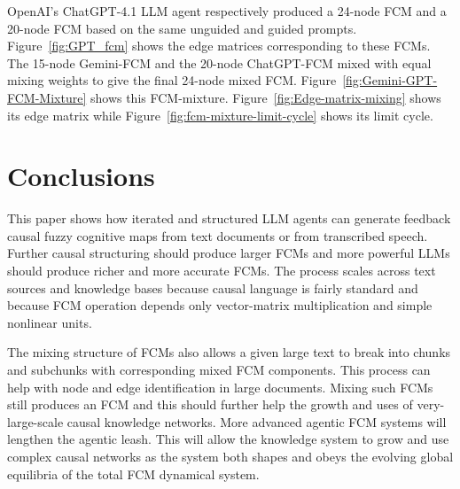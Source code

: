 \documentclass[runningheads]{llncs}
\begin{document}
OpenAI's ChatGPT-4.1 LLM agent respectively produced a 24-node FCM and a 20-node FCM based on the same unguided and guided prompts. 
Figure~\ref{fig:GPT_fcm} shows the edge matrices corresponding to these FCMs.
The 15-node Gemini-FCM and the 20-node ChatGPT-FCM mixed with equal mixing weights to give the final 24-node mixed FCM. 
Figure~\ref{fig:Gemini-GPT-FCM-Mixture} shows this FCM-mixture. 
Figure~\ref{fig:Edge-matrix-mixing} shows its edge matrix while Figure~\ref{fig:fcm-mixture-limit-cycle} shows its limit cycle.

\section{Conclusions}

This paper shows how iterated and structured LLM agents can generate feedback causal fuzzy cognitive maps from text documents or from transcribed speech.  Further causal structuring should produce larger FCMs and more powerful LLMs should produce richer and more accurate FCMs.  
The process scales across text sources and knowledge bases because causal language is fairly standard and because FCM operation depends only vector-matrix multiplication and simple nonlinear units.  

The mixing structure of FCMs also allows a given large text to break into chunks and subchunks with corresponding mixed FCM components.
This process can help with node and edge identification in large documents.
Mixing such FCMs still produces an FCM and this should further help the growth and uses of very-large-scale causal knowledge networks.
More advanced agentic FCM systems will lengthen the agentic leash.
This will allow the knowledge system to grow and use complex causal networks as the system both shapes and obeys the evolving global equilibria of the total FCM dynamical system.
%
%
%
% 
% 
%


\end{document}
